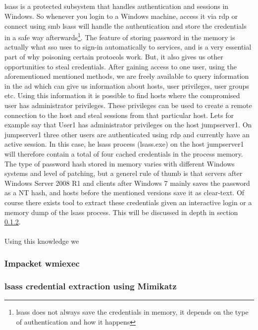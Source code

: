 \documentclass{article}
\begin{document}
\subsection{}
\gls{lsass} is a protected subsystem that handles authentication and sessions in Windows. So whenever you login to a Windows machine, access it via \gls{rdp} or connect using \gls{smb} \gls{lsass} will handle the authentication and store the credentials in a safe way afterwards\footnote{\gls{lsass} does not always save the credentials in memory, it depends on the type of authentication and how it happens\cite{url:lsass:cred-in-memory}}.
The feature of storing password in the memory is actually what \gls{sso} uses to sign-in automatically to services, and is a very essential part of why poisoning certain protocols work. But, it also gives us other opportunities to steal credentials. After gaining access to one user, using the aforementioned mentioned methods, we are freely available to query information in the \gls{ad} which can give us information about hosts, user privileges, user groups etc. Using this information it is possible to find hosts where the compromised user has administrator privileges. These privileges can be used to create a remote connection to the host and steal sessions from that particular host. Lets for example say that User1 has administrator privileges on the host jumpserver1. On jumpserver1 three other users are authenticated using \gls{rdp} and currently have an active session. In this case, he \gls{lsass} process (lsass.exe) on the host jumpserver1 will therefore contain a total of four cached credentials in the process memory. The type of password hash stored in memory varies with different Windows systems and level of patching, but a generel rule of thumb is that servers after Windows Server 2008 R1 and clients after Windows 7 mainly saves the password as a NT hash, and hosts before the mentioned versions save it as clear-text\cite{url:lsass:clear-text-2008}. Of course there exists tool to extract these credentials given an interactive login or a memory dump of the \gls{lsass} process. This will be discussed in depth in section \ref{sec:mimikatz}.
\\\\
Using this knowledge we


\subsubsection{Impacket wmiexec}
\subsubsection{\gls{lsass} credential extraction using Mimikatz}
\label{sec:mimikatz}
\end{document}
